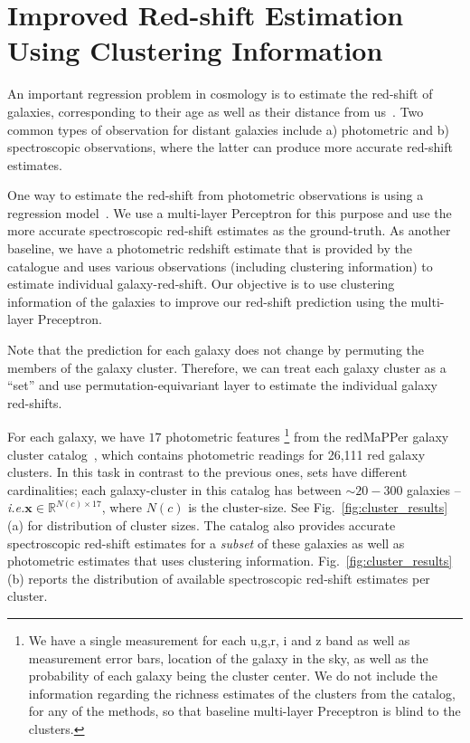 \documentclass{article}
\newcommand{\reffig}[1]{Fig.~\ref{#1}}
\newcommand{\xx}[0]{\ensuremath{\mathbf{x}}}
\newcommand{\latinphrase}[1]{\emph{#1}}    %
\newcommand{\ie}{\latinphrase{i.e.}\xspace}
\begin{document}
\section{Improved Red-shift Estimation Using Clustering Information}\label{app:red_shift}
An important regression problem in cosmology is to estimate the red-shift of galaxies, corresponding to their age as well as their distance from us~\cite{binney1998galactic}. Two common types of observation for distant galaxies include a) photometric and b) spectroscopic observations, where the latter can produce more accurate red-shift estimates.

One way to estimate the red-shift from photometric observations is using a regression model~\cite{connolly1995slicing}. We use a multi-layer Perceptron for this purpose and use the more accurate spectroscopic red-shift estimates as the ground-truth. As another baseline, we have a photometric redshift estimate that is provided by the catalogue and uses various observations (including clustering information) to estimate individual galaxy-red-shift. Our objective is to use clustering information of the galaxies to improve our red-shift prediction using the multi-layer Preceptron.

Note that the prediction for each galaxy does not change by permuting the members of the galaxy cluster. Therefore, we can treat each galaxy cluster as a ``set'' and use permutation-equivariant layer to estimate the individual galaxy red-shifts.
 
For each galaxy, we have $17$ photometric features \footnote{We have a single measurement for each u,g,r, i and z band as well as measurement error bars, location of the galaxy in the sky,  as well as the probability of each galaxy being the cluster center. We do not include the information regarding the richness estimates of the clusters from the catalog, for any of the methods, so that baseline multi-layer Preceptron is blind to the clusters.} from the redMaPPer galaxy cluster catalog~\cite{rozo2014redmapper}, which contains photometric readings for 26,111 red galaxy clusters.  In this task in contrast to the previous ones, sets have different cardinalities; each galaxy-cluster in this catalog has between $\sim 20-300$ galaxies -- \ie $\xx \in \mathbb{R}^{N(c) \times 17}$, where $N(c)$ is the cluster-size. See \reffig{fig:cluster_results}(a) for distribution of cluster sizes.  The catalog also provides accurate spectroscopic red-shift estimates for a \textit{subset} of these galaxies as well as photometric estimates that uses clustering information.  \reffig{fig:cluster_results}(b) reports the distribution of available spectroscopic red-shift estimates per cluster.
\end{document}
